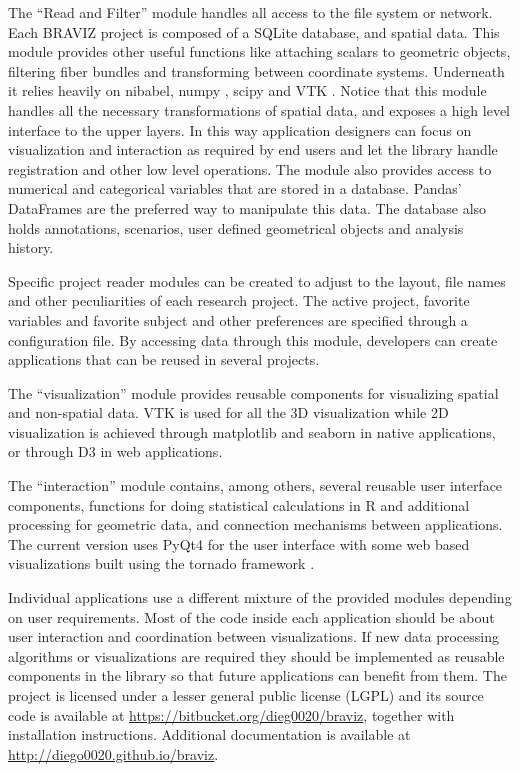 \documentclass[utf8,paper]{frontiersSCNS} %
\begin{document}
The ``Read and Filter'' module handles all access to the file system or network. Each BRAVIZ project is composed of a SQLite database, and spatial data. This module provides other useful functions like attaching scalars to geometric objects, filtering fiber bundles and transforming between coordinate systems. Underneath it relies heavily on nibabel\citep{gorgolewski_nipype:_2011}, numpy\citep{van_der_walt_numpy_2011} , scipy\citep{jones_scipy:_2001,oliphant_python_2007} and VTK\citep{schroeder_vtk_1998} . Notice that this module handles all the necessary transformations of spatial data, and exposes a high level interface to the upper layers. In this way application designers can focus on visualization and interaction as required by end users and let the library handle registration and other low level operations. The module also provides access to numerical and categorical variables that are stored in a database. Pandas' DataFrames\citep{mckinney_data_2010} are the preferred way to manipulate this data. The database also holds annotations, scenarios, user defined geometrical objects and analysis history. 

Specific project reader modules can be created to adjust to the layout, file names and other peculiarities of each research project. The active project, favorite variables and favorite subject and other preferences are specified through a configuration file.
By accessing data through this module, developers can create applications that can be reused in several projects. 

The ``visualization'' module provides reusable components for visualizing spatial and non-spatial data. VTK is used for all the 3D visualization while 2D visualization is achieved through matplotlib \citep{hunter_matplotlib:_2007} and seaborn\citep{michael_waskom_seaborn:_2014} in native applications, or through D3 \citep{bostock_d3_2011} in web applications.

The ``interaction'' module contains, among others, several reusable user interface components, functions for doing statistical calculations in R\citep{team_r:_2012, gautier_rpy2:_2008} and additional processing for geometric data, and connection mechanisms between applications. The current version uses PyQt4 for the user interface with some web based visualizations built using the tornado framework \citep{server_source_2008}. 

Individual applications use a different mixture of the provided modules depending on user requirements. Most of the code inside each application should be about user interaction and coordination between visualizations. If new data processing algorithms or visualizations are required they should be implemented as reusable components in the library so that future applications can benefit from them. The project is licensed under a lesser general public license (LGPL) and its source code is available at \url{https://bitbucket.org/dieg0020/braviz}, together with installation instructions. Additional documentation is available at \url{http://diego0020.github.io/braviz}.
\end{document}
